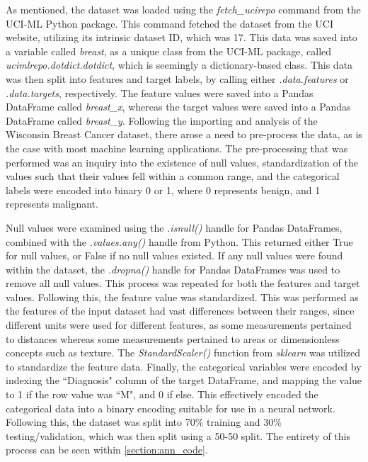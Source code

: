 \documentclass[a4paper]{article}
\begin{document}
As mentioned, the dataset was loaded using the \textit{fetch\_ucirepo} command from the UCI-ML Python package. This command fetched the dataset from the UCI website, utilizing its intrinsic dataset ID, which was 17. This data was saved into a variable called \textit{breast}, as a unique class from the UCI-ML package, called \textit{ucimlrepo.dotdict.dotdict}, which is seemingly a dictionary-based class. This data was then split into features and target labels, by calling either \textit{.data.features} or \textit{.data.targets}, respectively. The feature values were saved into a Pandas DataFrame called \textit{breast\_x}, whereas the target values were saved into a Pandas DataFrame called \textit{breast\_y}. Following the importing and analysis of the Wisconsin Breast Cancer dataset, there arose a need to pre-process the data, as is the case with most machine learning applications. The pre-processing that was performed was an inquiry into the existence of null values, standardization of the values such that their values fell within a common range, and the categorical labels were encoded into binary 0 or 1, where 0 represents benign, and 1 represents malignant. 

Null values were examined using the \textit{.isnull()} handle for Pandas DataFrames, combined with the \textit{.values.any()} handle from Python. This returned either True for null values, or False if no null values existed. If any null values were found within the dataset, the \textit{.dropna()} handle for Pandas DataFrames was used to remove all null values. This process was repeated for both the features and target values. Following this, the feature value was standardized. This was performed as the features of the input dataset had vast differences between their ranges, since different units were used for different features, as some measurements pertained to distances whereas some measurements pertained to areas or dimensionless concepts such as texture. The \textit{StandardScaler()} function from \textit{sklearn} was utilized to standardize the feature data. Finally, the categorical variables were encoded by indexing the ``Diagnosis" column of the target DataFrame, and mapping the value to 1 if the row value was ``M", and 0 if else. This effectively encoded the categorical data into a binary encoding suitable for use in a neural network. Following this, the dataset was split into 70\% training and 30\% testing/validation, which was then split using a 50-50 split. The entirety of this process can be seen within \ref{section:ann_code}.
\end{document}
